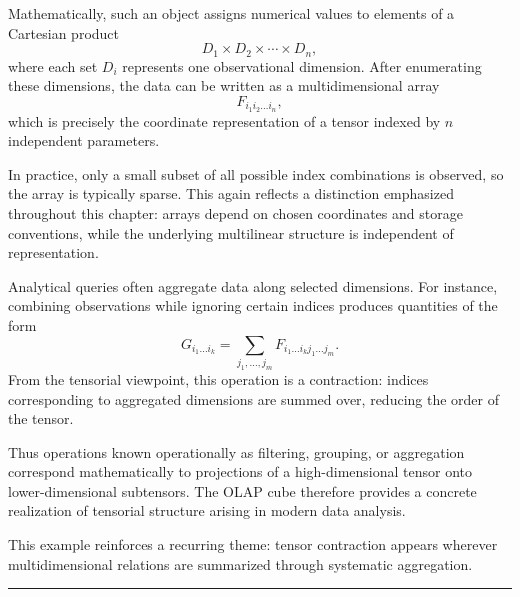 \medskip

Mathematically, such an object assigns numerical values to elements of a
Cartesian product
\[
D_1 \times D_2 \times \cdots \times D_n,
\]
where each set $D_i$ represents one observational dimension.
After enumerating these dimensions, the data can be written as a
multidimensional array
\[
F_{i_1 i_2 \dots i_n},
\]
which is precisely the coordinate representation of a tensor indexed by $n$
independent parameters.

\medskip

In practice, only a small subset of all possible index combinations is observed,
so the array is typically sparse.
This again reflects a distinction emphasized throughout this chapter: arrays
depend on chosen coordinates and storage conventions, while the underlying
multilinear structure is independent of representation.

\medskip

Analytical queries often aggregate data along selected dimensions.
For instance, combining observations while ignoring certain indices produces
quantities of the form
\[
G_{i_1 \dots i_k}
=
\sum_{j_1,\dots,j_m}
F_{i_1 \dots i_k j_1 \dots j_m}.
\]
From the tensorial viewpoint, this operation is a contraction: indices
corresponding to aggregated dimensions are summed over, reducing the order
of the tensor.

\medskip

Thus operations known operationally as filtering, grouping, or aggregation
correspond mathematically to projections of a high-dimensional tensor onto
lower-dimensional subtensors.
The OLAP cube therefore provides a concrete realization of tensorial structure
arising in modern data analysis.

\medskip

This example reinforces a recurring theme: tensor contraction appears wherever
multidimensional relations are summarized through systematic aggregation.

\medskip
\hrule
\bigskip